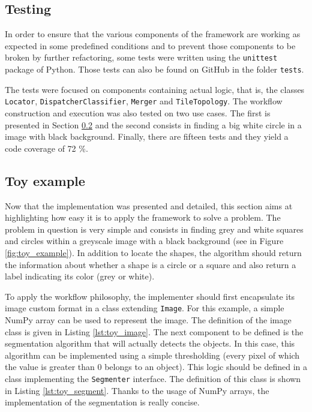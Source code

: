 \subsection{Testing}
\label{ssec:work_test}
In order to ensure that the various components of the framework are working as expected in some predefined conditions and to prevent those components to be broken by further refactoring, some tests were written using the \texttt{unittest} package of Python. Those tests can also be found on GitHub in the folder \texttt{tests}. 

The tests were focused on components containing actual logic, that is, the classes \texttt{Locator}, \texttt{DispatcherClassifier}, \texttt{Merger} and \texttt{TileTopology}. The workflow construction and execution was also tested on two use cases. The first is presented in Section \ref{ssec:work_toy_example} and the second consists in finding a big white circle in a image with black background. Finally, there are fifteen tests and they yield a code coverage of 72 \%.\\

\subsection{Toy example}
\label{ssec:work_toy_example}
Now that the implementation was presented and detailed, this section aims at highlighting how easy it is to apply the framework to solve a problem. The problem in question is very simple and consists in finding grey and white squares and circles within a greyscale image with a black background (see in Figure \ref{fig:toy_example}). In addition to locate the shapes, the algorithm should return the information about whether a shape is a circle or a square and also return a label indicating its color (grey or white). 

To apply the workflow philosophy, the implementer should first encapsulate its image custom format in a class extending \texttt{Image}. For this example, a simple NumPy array can be used to represent the image. The definition of the image class is given in Listing \ref{lst:toy_image}. The next component to be defined is the segmentation algorithm that will actually detects the objects. In this case, this algorithm can be implemented using a simple thresholding (every pixel of which the value is greater than 0 belongs to an object). This logic should be defined in a class implementing the \texttt{Segmenter} interface. The definition of this class is shown in Listing \ref{lst:toy_segment}. Thanks to the usage of NumPy arrays, the implementation of the segmentation is really concise. 

